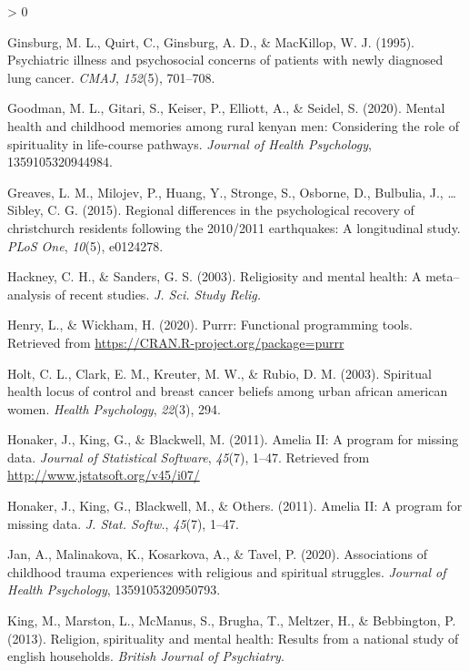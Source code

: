 \documentclass[
  english,
  man,floatsintext]{apa6}
\newlength{\cslhangindent}
\newenvironment{CSLReferences}[2] %
 {%
  \setlength{\parindent}{0pt}
  \ifodd #1 \everypar{\setlength{\hangindent}{\cslhangindent}}\ignorespaces\fi
  \ifnum #2 > 0
  \setlength{\parskip}{#2\baselineskip}
  \fi
 }%
 {}
\begin{document}
\begin{CSLReferences}{1}{0}
\leavevmode\hypertarget{ref-Ginsburg1995-jr}{}%
Ginsburg, M. L., Quirt, C., Ginsburg, A. D., \& MacKillop, W. J. (1995). Psychiatric illness and psychosocial concerns of patients with newly diagnosed lung cancer. \emph{CMAJ}, \emph{152}(5), 701--708.

\leavevmode\hypertarget{ref-goodman2020mental}{}%
Goodman, M. L., Gitari, S., Keiser, P., Elliott, A., \& Seidel, S. (2020). Mental health and childhood memories among rural kenyan men: Considering the role of spirituality in life-course pathways. \emph{Journal of Health Psychology}, 1359105320944984.

\leavevmode\hypertarget{ref-greaves2015regional}{}%
Greaves, L. M., Milojev, P., Huang, Y., Stronge, S., Osborne, D., Bulbulia, J., \ldots{} Sibley, C. G. (2015). Regional differences in the psychological recovery of christchurch residents following the 2010/2011 earthquakes: A longitudinal study. \emph{PLoS One}, \emph{10}(5), e0124278.

\leavevmode\hypertarget{ref-Hackney2003-rs}{}%
Hackney, C. H., \& Sanders, G. S. (2003). Religiosity and mental health: A meta--analysis of recent studies. \emph{J. Sci. Study Relig.}

\leavevmode\hypertarget{ref-R-purrr}{}%
Henry, L., \& Wickham, H. (2020). Purrr: Functional programming tools. Retrieved from \url{https://CRAN.R-project.org/package=purrr}

\leavevmode\hypertarget{ref-holt2003spiritual}{}%
Holt, C. L., Clark, E. M., Kreuter, M. W., \& Rubio, D. M. (2003). Spiritual health locus of control and breast cancer beliefs among urban african american women. \emph{Health Psychology}, \emph{22}(3), 294.

\leavevmode\hypertarget{ref-R-Amelia}{}%
Honaker, J., King, G., \& Blackwell, M. (2011). {Amelia II}: A program for missing data. \emph{Journal of Statistical Software}, \emph{45}(7), 1--47. Retrieved from \url{http://www.jstatsoft.org/v45/i07/}

\leavevmode\hypertarget{ref-Honaker2011-yu}{}%
Honaker, J., King, G., Blackwell, M., \& Others. (2011). Amelia {II}: A program for missing data. \emph{J. Stat. Softw.}, \emph{45}(7), 1--47.

\leavevmode\hypertarget{ref-januu2020associations}{}%
Jan, A., Malinakova, K., Kosarkova, A., \& Tavel, P. (2020). Associations of childhood trauma experiences with religious and spiritual struggles. \emph{Journal of Health Psychology}, 1359105320950793.

\leavevmode\hypertarget{ref-King2013-cg}{}%
King, M., Marston, L., McManus, S., Brugha, T., Meltzer, H., \& Bebbington, P. (2013). Religion, spirituality and mental health: Results from a national study of english households. \emph{British Journal of Psychiatry}.


\end{CSLReferences}
\end{document}
